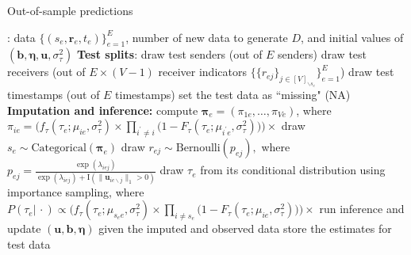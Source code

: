 \documentclass[ba]{imsart}
\def\spacingset#1{\renewcommand{\baselinestretch}%
	{#1}\small\normalsize} \spacingset{1}
\numberwithin{equation}{section}
\theoremstyle{plain}
\begin{document}
	\begin{algorithm}[!t]
		\spacingset{1}
		\caption{Out-of-sample predictions}
		\label{alg:PPE}
		\begin{algorithmic}
			: data $ \{ (s_e, \boldsymbol{r}_e, t_e)\}_{e=1}^E$, 
			number of new data to generate $D$, and initial values of $(\boldsymbol{b}, \boldsymbol{\eta}, \boldsymbol{u}, \sigma^2_\tau)$
			\vskip 0.1in
			\textbf{Test splits}:	
			\STATE draw test senders (out of $E$ senders) 
			\STATE draw test receivers (out of $E\times (V-1)$ receiver indicators $\{\{{r}_{ej}\}_{j\in [V]_{\backslash s_e}}\}_{e=1}^E$)
			\STATE draw test timestamps  (out of $E$ timestamps) 
			\STATE set the test data as ``missing" (NA)
			\vskip 0.1in
			\textbf{Imputation and inference:}	
			\STATE compute $\boldsymbol{\pi}_e = (\pi_{1e},\ldots,\pi_{Ve})$, where \\$\pi_{ie}=\Big(f_{\tau}(\tau_{ e}; \mu_{i e}, \sigma_\tau^2)\times \prod_{i^\prime\neq i}\big(1-F_{\tau}(\tau_{ e}; \mu_{i^\prime  e}, \sigma_\tau^2) \big)\Big) \times$
			\STATE draw $s_e \sim \mbox{Categorical}(\boldsymbol{\pi}_e)$ 
			\ENDIF
			\STATE draw $r_{ej} \sim \mbox{Bernoulli}(p_{ej}),$
			where $p_{ej}=\frac{\exp(\lambda_{iej})}{\exp(\lambda_{iej})+\text{I}(\lVert\boldsymbol{u}_{ie\backslash j}\rVert_1 > 0 )}$ %
			\ENDIF
			\ENDFOR
			\STATE draw ${\tau}_e$ from its conditional distribution using importance sampling, %
	      where $P({\tau}_e|\, \cdot)\propto \Big(f_{\tau}(\tau_{e}; \mu_{s_{e} e}, \sigma_\tau^2)\times \prod_{i\neq s_{e}}\big(1-F_{\tau}(\tau_{e}; \mu_{ie}, \sigma_\tau^2)\big)\Big) \times $%
			\ENDIF
			\STATE run inference and update $(\boldsymbol{u},\boldsymbol{b}, \boldsymbol{\eta})$ given the imputed and observed data
			\ENDFOR
			\STATE store the estimates for test data
			\ENDFOR
		\end{algorithmic}
	\end{algorithm}
	
\end{document}
